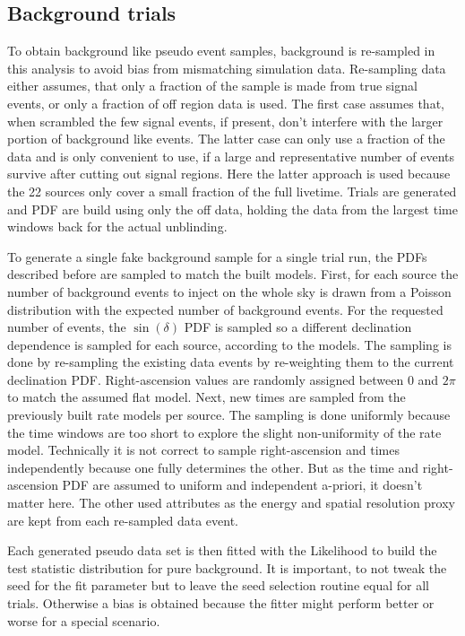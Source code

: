\subsection*{Background trials}
To obtain background like pseudo event samples, background is re-sampled in this analysis to avoid bias from mismatching simulation data.
Re-sampling data either assumes, that only a fraction of the sample is made from true signal events, or only a fraction of off region data is used.
The first case assumes that, when scrambled the few signal events, if present, don't interfere with the larger portion of background like events.
The latter case can only use a fraction of the data and is only convenient to use, if a large and representative number of events survive after cutting out signal regions.
Here the latter approach is used because the 22 sources only cover a small fraction of the full livetime.
Trials are generated and PDF are build using only the off data, holding the data from the largest time windows back for the actual unblinding.

To generate a single fake background sample for a single trial run, the PDFs described before are sampled to match the built models.
First, for each source the number of background events to inject on the whole sky is drawn from a Poisson distribution with the expected number of background events.
For the requested number of events, the $\sin(\delta)$ PDF is sampled so a different declination dependence is sampled for each source, according to the models.
The sampling is done by re-sampling the existing data events by re-weighting them to the current declination PDF.
Right-ascension values are randomly assigned between $0$ and $2\pi$ to match the assumed flat model.
Next, new times are sampled from the previously built rate models per source.
The sampling is done uniformly because the time windows are too short to explore the slight non-uniformity of the rate model.
Technically it is not correct to sample right-ascension and times independently because one fully determines the other.
But as the time and right-ascension PDF are assumed to uniform and independent a-priori, it doesn't matter here.
The other used attributes as the energy and spatial resolution proxy are kept from each re-sampled data event.

Each generated pseudo data set is then fitted with the Likelihood to build the test statistic distribution for pure background.
It is important, to not tweak the seed for the fit parameter but to leave the seed selection routine equal for all trials.
Otherwise a bias is obtained because the fitter might perform better or worse for a special scenario.

